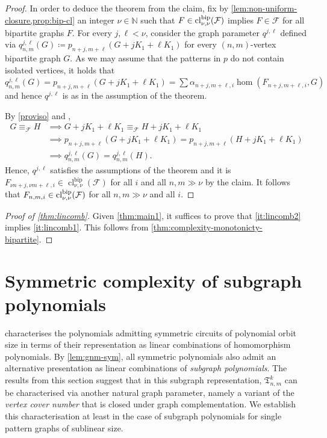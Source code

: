 \documentclass[10pt,a4paper]{article}
\theoremstyle{definition}
\theoremstyle{plain}
\theoremstyle{remark}
\DeclareMathOperator{\cl}{cl}
\begin{document}
\begin{proof}
		In order to deduce the theorem from the claim,
		fix by \cref{lem:non-uniform-closure,prop:bip-cl} an integer $\nu \in \mathbb{N}$ such that $F \in \cl_{\nu,\nu}^{\textup{bip}}(\mathcal{F}) $ implies $F \in \mathcal{F}$
		for all bipartite graphs $F$.
		For every $j, \ell < \nu$,
		consider the graph parameter $q^{j, \ell}$
		defined via 
		$q_{n,m}^{j, \ell}(G) \coloneqq p_{n+j, m+\ell}(G +jK_1 + \ell K_1)$ for every $(n,m)$-vertex bipartite graph $G$.
		As we may assume that the patterns in $p$ do not contain isolated vertices, it holds that
		$q^{j, \ell}_{n, m}(G) = p_{n+j, m+\ell}(G + jK_1 + \ell K_1) = \sum \alpha_{n+j, m+\ell, i} \hom(F_{n+j, m+\ell,i}, G)$ 
		and hence $q^{j, \ell}$ is as in the assumption of the theorem.
		
		By \cref{proviso} and \cite[Theorem~7]{seppelt_logical_2024},
		\begin{align*}
			G \equiv_{\mathcal{F}} H
			&\implies G+jK_1 + \ell K_1 \equiv_{\mathcal{F}} H+ jK_1 + \ell K_1 \\
			&\implies p_{n+j, m+\ell}(G+jK_1 + \ell K_1) = p_{n+j, m+\ell}(H+jK_1+\ell K_1)\\
			&\implies q_{n,m}^{j, \ell}(G) = q_{n,m}^{j, \ell}(H).
		\end{align*}
		Hence, $q^{j,\ell}$ satisfies the assumptions of the theorem
		and it is $F_{\nu n +j, \nu m + \ell, i} \in \cl_{\nu, \nu}^{\text{bip}}(\mathcal{F})$ for all $i$ and
		all $n, m \gg \nu$ by the claim.
		It follows that $F_{n, m,i} \in \cl_{\nu, \nu}^{\textup{bip}}(\mathcal{F})$ for all $n,m \gg \nu$ and all $i$.
	\end{proof}

	\begin{proof}[Proof of \cref{thm:lincomb}]
		Given \cref{thm:main1},
		it suffices to prove that \ref{it:lincomb2} implies \ref{it:lincomb1}.
		This follows from \cref{thm:complexity-monotonicty-bipartite}.
	\end{proof}
	
	\section{Symmetric complexity of subgraph polynomials}
	
	
	 characterises the polynomials admitting symmetric circuits of polynomial orbit size in terms of their representation as linear combinations of homomorphism polynomials.
	By \cref{lem:gnm-sym}, all symmetric polynomials also admit an alternative presentation as linear combinations of \emph{subgraph polynomials}.
	The results from this section suggest that in this subgraph representation, $\mathfrak{T}^k_{n,m}$ can be characterised via another natural graph parameter, namely a variant of the \emph{vertex cover number} that is closed under graph complementation. 
	We establish this characterisation at least in the case of subgraph polynomials for single pattern graphs of sublinear size.
		
\end{document}
